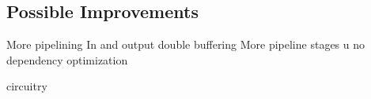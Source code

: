 \subsection{Possible Improvements}
More pipelining
In and output double buffering
More pipeline stages
u no dependency optimization


circuitry
